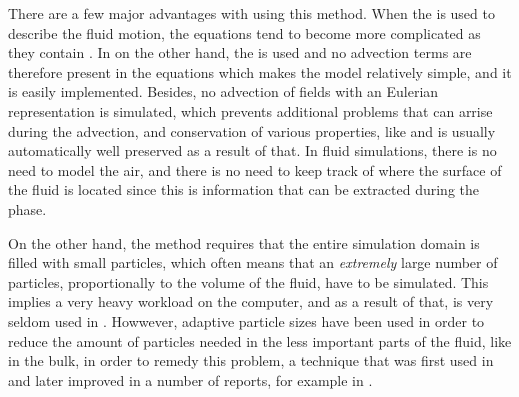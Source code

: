There are a few major advantages with using this method. When the  is used to describe the fluid motion, the equations tend to become more complicated as they contain . In \SPH on the other hand, the  is used and no advection terms are therefore present in the equations which makes the model relatively simple, and it is easily implemented. Besides, no advection of fields with an Eulerian representation is simulated, which prevents additional problems that can arrise during the advection, and conservation of various properties, like \momentum and \energy is usually automatically well preserved as a result of that. In fluid simulations, there is no need to model the air, and there is no need to keep track of where the surface of the fluid is located since this is information that can be extracted during the  phase.

On the other hand, the \SPH method requires that the entire simulation domain is filled with small particles, which often means that an \emph{extremely} large number of particles, proportionally to the volume of the fluid, have to be simulated. This implies a very heavy workload on the computer, and as a result of that, \SPH is very seldom used in . Howwever, adaptive particle sizes have been used in order to reduce the amount of particles needed in the less important parts of the fluid, like in the bulk, in order to remedy this problem, a technique that was first used in \citep{Desbrun1999} and later improved in a number of reports, for example in \citep{Yan2009}.





